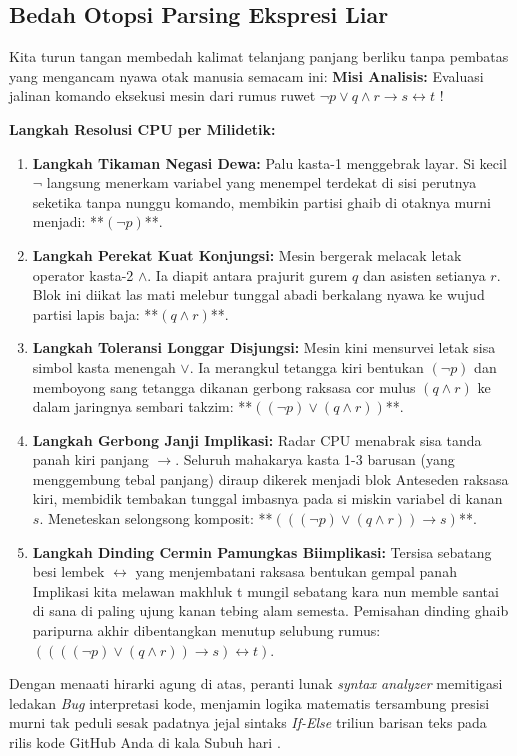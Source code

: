 \subsection{Bedah Otopsi Parsing Ekspresi Liar}

Kita turun tangan membedah kalimat telanjang panjang berliku tanpa pembatas yang mengancam nyawa otak manusia semacam ini:
\textbf{Misi Analisis:} Evaluasi jalinan komando eksekusi mesin dari rumus ruwet $\neg p \vee q \wedge r \rightarrow s \leftrightarrow t$ !

\textbf{Langkah Resolusi CPU per Milidetik:}
\begin{enumerate}
    \item \textbf{Langkah Tikaman Negasi Dewa:} Palu kasta-1 menggebrak layar. Si kecil $\neg$ langsung menerkam variabel yang menempel terdekat di sisi perutnya seketika tanpa nunggu komando, membikin partisi ghaib di otaknya murni menjadi: **$(\neg p)$**.
    \item \textbf{Langkah Perekat Kuat Konjungsi:} Mesin bergerak melacak letak operator kasta-2 $\wedge$. Ia diapit antara prajurit gurem $q$ dan asisten setianya $r$. Blok ini diikat las mati melebur tunggal abadi berkalang nyawa ke wujud partisi lapis baja: **$(q \wedge r)$**.
    \item \textbf{Langkah Toleransi Longgar Disjungsi:} Mesin kini mensurvei letak sisa simbol kasta menengah $\vee$. Ia merangkul tetangga kiri bentukan $(\neg p)$ dan memboyong sang tetangga dikanan gerbong raksasa cor mulus $(q \wedge r)$ ke dalam jaringnya sembari takzim: **$( (\neg p) \vee (q \wedge r) )$**.
    \item \textbf{Langkah Gerbong Janji Implikasi:} Radar CPU menabrak sisa tanda panah kiri panjang $\rightarrow$. Seluruh mahakarya kasta 1-3 barusan (yang menggembung tebal panjang) diraup dikerek menjadi blok Anteseden raksasa kiri, membidik tembakan tunggal imbasnya pada si miskin variabel di kanan $s$. Meneteskan selongsong komposit: **$(( (\neg p) \vee (q \wedge r) ) \rightarrow s)$**.
    \item \textbf{Langkah Dinding Cermin Pamungkas Biimplikasi:} Tersisa sebatang besi lembek $\leftrightarrow$ yang menjembatani raksasa bentukan gempal panah Implikasi kita melawan makhluk t mungil sebatang kara nun memble santai di sana di paling ujung kanan tebing alam semesta. Pemisahan dinding ghaib paripurna akhir dibentangkan menutup selubung rumus: \textbf{$((( (\neg p) \vee (q \wedge r) ) \rightarrow s) \leftrightarrow t)$}. 
\end{enumerate}

Dengan menaati hirarki agung di atas, peranti lunak \textit{syntax analyzer} memitigasi ledakan \textit{Bug} interpretasi kode, menjamin logika matematis tersambung presisi murni tak peduli sesak padatnya jejal sintaks \textit{If-Else} triliun barisan teks pada rilis kode GitHub Anda di kala Subuh hari \cite{wiki_first_order_logic}.
